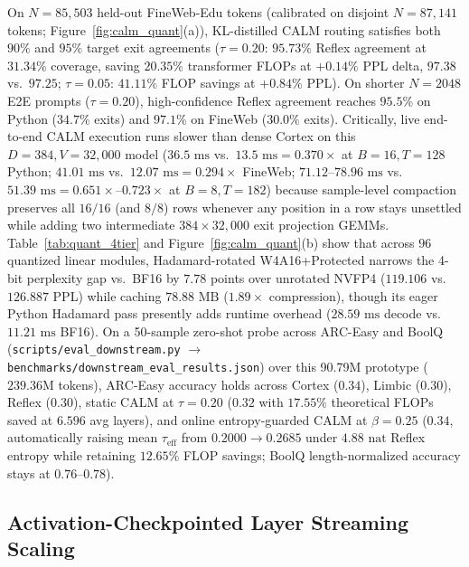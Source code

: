 \documentclass[10pt,twocolumn,letterpaper]{article}
\begin{document}
On $N=85,503$ held-out FineWeb-Edu tokens (calibrated on disjoint $N=87,141$ tokens; Figure~\ref{fig:calm_quant}(a)), KL-distilled CALM routing satisfies both $90\%$ and $95\%$ target exit agreements ($\tau=0.20$: $95.73\%$ Reflex agreement at $31.34\%$ coverage, saving $20.35\%$ transformer FLOPs at $+0.14\%$ PPL delta, $97.38$ vs.\ $97.25$; $\tau=0.05$: $41.11\%$ FLOP savings at $+0.84\%$ PPL). On shorter $N=2048$ E2E prompts ($\tau=0.20$), high-confidence Reflex agreement reaches $95.5\%$ on Python ($34.7\%$ exits) and $97.1\%$ on FineWeb ($30.0\%$ exits). Critically, live end-to-end CALM execution runs slower than dense Cortex on this $D=384, V=32,000$ model ($36.5\text{ ms}$ vs.\ $13.5\text{ ms} = 0.370\times$ at $B=16, T=128$ Python; $41.01\text{ ms}$ vs.\ $12.07\text{ ms} = 0.294\times$ FineWeb; $71.12\text{--}78.96\text{ ms}$ vs.\ $51.39\text{ ms} = 0.651\times\text{--}0.723\times$ at $B=8, T=182$) because sample-level compaction preserves all $16/16$ (and $8/8$) rows whenever any position in a row stays unsettled while adding two intermediate $384 \times 32,000$ exit projection GEMMs. Table~\ref{tab:quant_4tier} and Figure~\ref{fig:calm_quant}(b) show that across $96$ quantized linear modules, Hadamard-rotated W4A16+Protected narrows the 4-bit perplexity gap vs.\ BF16 by $7.78$ points over unrotated NVFP4 ($119.106$ vs.\ $126.887$ PPL) while caching $78.88\text{ MB}$ ($1.89\times$ compression), though its eager Python Hadamard pass presently adds runtime overhead ($28.59\text{ ms}$ decode vs.\ $11.21\text{ ms}$ BF16). On a 50-sample zero-shot probe across ARC-Easy and BoolQ (\texttt{scripts/eval\_downstream.py} $\to$ \texttt{benchmarks/downstream\_eval\_results.json}) over this 90.79M prototype ($239.36\text{M}$ tokens), ARC-Easy accuracy holds across Cortex ($0.34$), Limbic ($0.30$), Reflex ($0.30$), static CALM at $\tau=0.20$ ($0.32$ with $17.55\%$ theoretical FLOPs saved at $6.596$ avg layers), and online entropy-guarded CALM at $\beta=0.25$ ($0.34$, automatically raising mean $\tau_{\text{eff}}$ from $0.2000 \to 0.2685$ under $4.88\text{ nat}$ Reflex entropy while retaining $12.65\%$ FLOP savings; BoolQ length-normalized accuracy stays at $0.76$--$0.78$).

\subsection{Activation-Checkpointed Layer Streaming Scaling}
\end{document}

